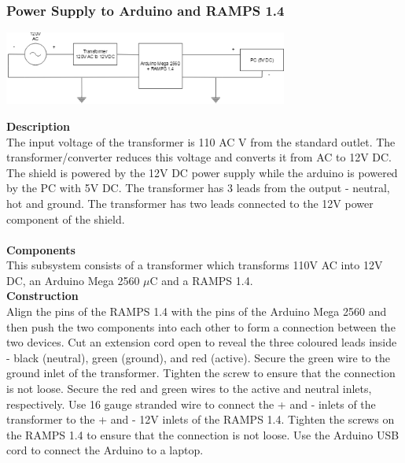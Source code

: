 \documentclass[titlepage]{article}
\begin{document}
\subsubsection{Power Supply to Arduino and RAMPS 1.4}
\begin{center}
	\includegraphics[width = 0.7\textwidth]{PowerSupply.png}
\label{fig:PowerSupplyFig}
\end{center}
\textbf{Description}\\
The input voltage of the transformer is 110 AC V from the standard outlet. The transformer/converter reduces this voltage and converts it from AC to 12V DC. The shield is powered by the 12V DC power supply while the arduino is powered by the PC with 5V DC. The transformer has 3 leads from the output - neutral, hot and ground. The transformer has two leads connected to the 12V power component of the shield.\\\\
\textbf{Components}\\
This subsystem consists of a transformer which transforms 110V AC into 12V DC, an Arduino Mega 2560 $\mu$C and a RAMPS 1.4.\\
\textbf{Construction}\\
Align the pins of the RAMPS 1.4 with the pins of the Arduino Mega 2560 and then push the two components into each other to form a connection between the two devices. Cut an extension cord open to reveal the three coloured leads inside - black (neutral), green (ground), and red (active). Secure the green wire to the ground inlet of the transformer. Tighten the screw to ensure that the connection is not loose. Secure the red and green wires to the active and neutral inlets, respectively. Use 16 gauge stranded wire to connect the + and - inlets of the transformer to the + and - 12V inlets of the RAMPS 1.4. Tighten the screws on the RAMPS 1.4 to ensure that the connection is not loose. Use the Arduino USB cord to connect the Arduino to a laptop.
\end{document}
